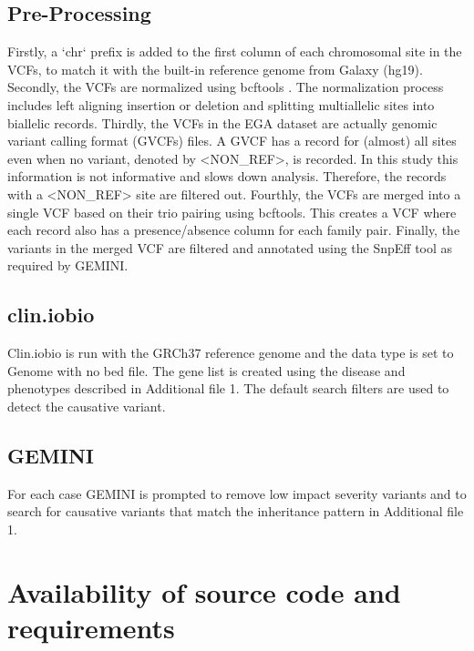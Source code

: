 \subsection*{Pre-Processing}
Firstly, a `chr` prefix is added to the first column of each chromosomal site in the VCFs, to match it with the built-in reference genome from Galaxy (hg19).
Secondly, the VCFs are normalized using bcftools \cite{bcftools}. The normalization process includes left aligning insertion or deletion and splitting multiallelic sites into biallelic records.
Thirdly, the VCFs in the EGA dataset are actually genomic variant calling format (GVCFs) files. A GVCF has a record for (almost) all sites even when no variant, denoted by <NON\_REF>, is recorded. In this study this information is not informative and slows down analysis. Therefore, the records with a <NON\_REF> site are filtered out.
Fourthly, the VCFs are merged into a single VCF based on their trio pairing using bcftools. This creates a VCF where each record also has a presence/absence column for each family pair.
Finally, the variants in the merged VCF are filtered and annotated using the SnpEff tool \cite{SnpEff} as required by GEMINI. 

\subsection*{clin.iobio}
Clin.iobio is run with the GRCh37 reference genome and the data type is set to Genome with no bed file. The gene list is created using the disease and phenotypes described in Additional file 1. The default search filters are used to detect the causative variant.

\subsection*{GEMINI}
For each case GEMINI is prompted to remove low impact severity variants and to search for causative variants that match the inheritance pattern in Additional file 1. 

\section*{Availability of source code and requirements}

